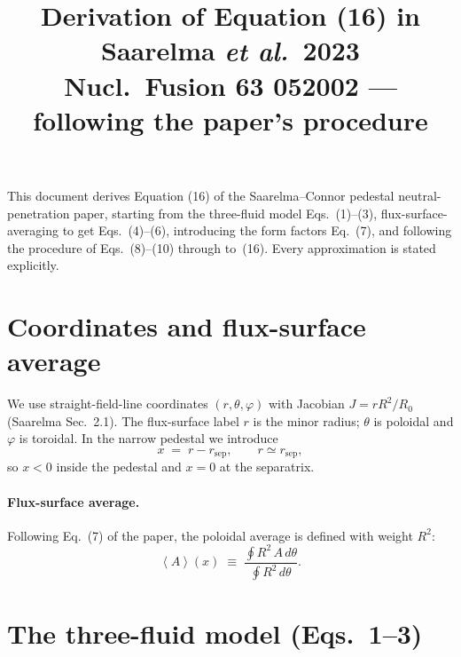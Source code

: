 \documentclass[11pt]{article}
\title{Derivation of Equation (16) in Saarelma \emph{et al.}~2023\\
  \large Nucl.\ Fusion \textbf{63} 052002 --- following the paper's procedure}
\author{}
\date{}
\newcommand{\fsa}[1]{\left\langle #1 \right\rangle}
\begin{document}
\maketitle

This document derives Equation (16) of the Saarelma--Connor pedestal
neutral-penetration paper, starting from the three-fluid model Eqs.~(1)--(3),
flux-surface-averaging to get Eqs.~(4)--(6), introducing the form factors
Eq.~(7), and following the procedure of Eqs.~(8)--(10) through to~(16).
Every approximation is stated explicitly.

\section{Coordinates and flux-surface average}
\label{sec:coords}

We use straight-field-line coordinates $(r,\theta,\varphi)$ with Jacobian
$J = rR^{2}/R_{0}$ (Saarelma Sec.~2.1).  The flux-surface label
$r$ is the minor radius; $\theta$ is poloidal and $\varphi$ is toroidal.
In the narrow pedestal we introduce
\[
  x \;=\; r - r_{\mathrm{sep}}, \qquad r\simeq r_{\mathrm{sep}},
\]
so $x<0$ inside the pedestal and $x=0$ at the separatrix.

\paragraph{Flux-surface average.}
Following Eq.~(7) of the paper, the poloidal average is defined with
weight $R^{2}$:
\begin{equation}
  \fsa{A}(x) \;\equiv\; \frac{\oint R^{2}\,A\,d\theta}{\oint R^{2}\,d\theta}.
\end{equation}

\section{The three-fluid model (Eqs.~1--3)}
\label{sec:threefluid}
\end{document}
